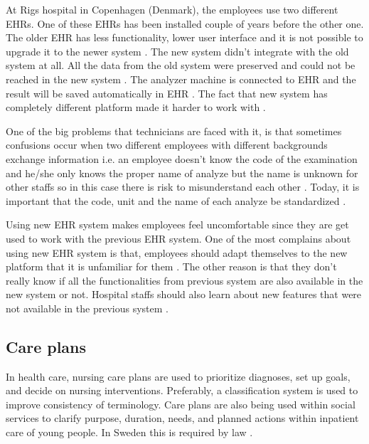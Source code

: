 \documentclass[14pt]{article}
\begin{document}
At Rigs hospital in Copenhagen (Denmark), the employees use two different \glspl{EHR}. One of these \glspl{EHR} has been installed couple of years before the other one. The older \gls{EHR} has less functionality, lower user interface and it is not possible to upgrade it to the newer system \cite{FarzinYazdi}. The new system didn't integrate with the old system at all. All the data from the old system were preserved and could not be reached in the new system \cite{FarzinYazdi}. The analyzer machine is connected to \gls{EHR} and the result will be saved automatically in \gls{EHR} \cite{FarzinYazdi}. The fact that new system has completely different platform made it harder to work with \cite{FarzinYazdi}.

One of the big problems that technicians are faced with it, is that sometimes confusions occur when two different employees with different backgrounds exchange information i.e. an employee doesn't know the code of the examination and he/she only knows the proper name of analyze but the name is unknown for other staffs so in this case there is risk to misunderstand each other \cite{FarzinYazdi}. Today, it is important that the code, unit and the name of each analyze be standardized \cite{FarzinYazdi}.

Using new \gls{EHR} system makes employees feel uncomfortable since they are get used to work with the previous \gls{EHR} system. One of the most complains about using new \gls{EHR} system is that, employees should adapt themselves to the new platform that it is unfamiliar for them \cite{FarzinYazdi}. The other reason is that they don’t really know if all the functionalities from previous system are also available in the new system or not. Hospital staffs should also learn about new features that were not available in the previous system \cite{FarzinYazdi}.
\label{sec:techMotiv}

\subsection{Care plans}
\label{sec:interopPlans}
In health care, nursing care plans are used to prioritize diagnoses, set up goals, and decide on nursing interventions. Preferably, a classification system is used to improve consistency of terminology. Care plans are also being used within social services to clarify purpose, duration, needs, and planned actions within inpatient care of young people. In Sweden this is required by law \cite{SocialServices}.
\end{document}
